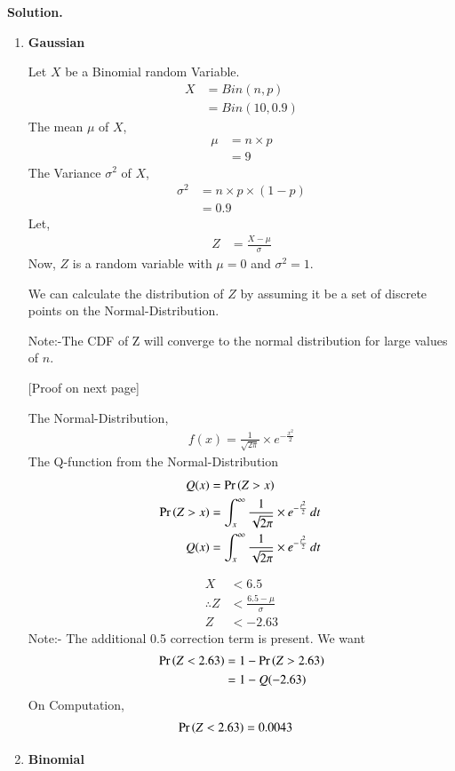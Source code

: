 \documentclass[journal,12pt,twocolumn]{IEEEtran}
\begin{document}
\textbf{Solution.}
\begin{enumerate}
    \item 
    \textbf{Gaussian}
    
Let $X$ be a Binomial random Variable.
\begin{align}
    X&=Bin(n,p)\\
    &=Bin(10,0.9)
\end{align}
The mean $\mu$ of $X$,
\begin{align}
    \mu &= n\times p\\
    &= 9
\end{align}
The Variance $\sigma^2$ of $X$,
\begin{align}
    \sigma^2 &= n\times p\times (1-p)\\
    &= 0.9
\end{align}
Let,
\begin{align}
    Z&=\frac{X-\mu}{\sigma}
\end{align}
Now, $Z$ is a random variable with $\mu=0$ and $\sigma^2=1$.

We can calculate the distribution of $Z$ by assuming it be a set of discrete points on the Normal-Distribution.

Note:-The CDF of Z will converge to the normal distribution for large values of $n$.

[Proof on next page]

The Normal-Distribution,
\begin{align}
    f(x) = \frac{1}{\sqrt{2\pi}}\times e^{-\frac{x^2}{2}}
\end{align}
The Q-function from the Normal-Distribution
\begin{align}
    Q(x) &=\Pr\left(Z>x\right)\\
    \Pr\left(Z>x\right)&=\int_{x}^{\infty} \frac{1}{\sqrt{2\pi}}\times e^{-\frac{t^2}{2}} \,dt\\\
    Q(x)&=\int_{x}^{\infty} \frac{1}{\sqrt{2\pi}}\times e^{-\frac{t^2}{2}} \,dt\
\end{align}

\begin{align}
    X &< 6.5\\
    \therefore Z &< \frac{6.5-\mu}{\sigma}\\
    Z&<-2.63
\end{align}
Note:- The additional 0.5 correction term is present.
We want
\begin{align}
\Pr\left(Z<2.63\right) &= 1-\Pr\left(Z>2.63\right)\\
    &= 1- Q(-2.63)
\end{align}
On Computation,
\begin{align}
\Pr\left(Z<2.63\right) &= 0.0043
\end{align}
\item 
\textbf{Binomial}


\end{enumerate}
\end{document}
